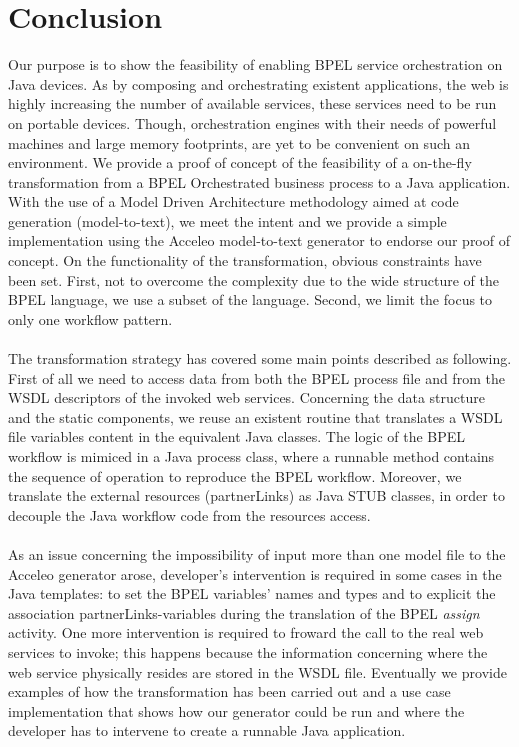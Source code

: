 \section{Conclusion}
\label{Conclusion}
Our purpose is to show the feasibility of enabling BPEL service orchestration on Java devices. As by composing and orchestrating existent applications, the web is highly increasing the number of available services, these services need to be run on portable devices. Though, orchestration engines with their needs of powerful machines and large memory footprints, are yet to be convenient on such an environment.
We provide a proof of concept of the feasibility of a on-the-fly transformation from a BPEL Orchestrated business process to a Java application. 
With the use of a Model Driven Architecture methodology aimed at code generation (model-to-text), we meet the intent and we provide a simple implementation using the Acceleo model-to-text generator to endorse our proof of concept.
On the functionality of the transformation, obvious constraints have been set. First, not to overcome the complexity due to the wide structure of the BPEL language, we use a subset of the language. Second, we limit the focus to only one workflow pattern.

\paragraph{}
The transformation strategy has covered some main points described as following. First of all we need to access data from both the BPEL process file and from the WSDL descriptors of the invoked web services. 
Concerning the data structure and the static components, we reuse an existent routine that translates a WSDL file variables content in the equivalent Java classes. 
The logic of the BPEL workflow is mimiced in a Java process class, where a runnable method contains the sequence of operation to reproduce the BPEL workflow.
Moreover, we translate the external resources (partnerLinks) as Java STUB classes, in order to decouple the Java workflow code from the resources access.

\paragraph{}
As an issue concerning the impossibility of input more than one model file to the Acceleo generator arose, developer's intervention is required in some cases in the Java templates: to set the BPEL variables' names and types and to explicit the association partnerLinks-variables during the translation of the BPEL \textit{assign} activity. One more intervention is required to froward the call to the real web services to invoke; this happens because the information concerning where the web service physically resides are stored in the WSDL file.
Eventually we provide examples of how the transformation has been carried out and a use case implementation that shows how our generator could be run and where the developer has to intervene to create a runnable Java application. 

